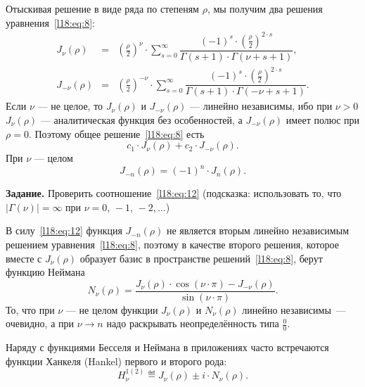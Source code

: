 Отыскивая решение в виде ряда по степеням $\rho$, мы получим два решения уравнения~\eqref{l18:eq:8}:
\begin{equation*}
	\begin{array}{rcl}  J_{\nu}(\rho)&=&\displaystyle\left(\frac{\rho}{2}\right)^{\nu}\cdot\sum\limits_{s=0}^{\infty}\dfrac{(-1)^s\cdot\left(\frac{\rho}{2}\right)^{2\cdot s}}{\Gamma(s+1)\cdot\Gamma(\nu+s+1)},\\[12pt]  J_{-\nu}(\rho)&=&\displaystyle\left(\frac{\rho}{2}\right)^{-\nu}\cdot\sum\limits_{s=0}^{\infty}\dfrac{(-1)^s\cdot\left(\frac{\rho}{2}\right)^{2\cdot s}}{\Gamma(s+1)\cdot\Gamma(-\nu+s+1)}.
	\end{array}
\end{equation*} 
Если $\nu$ --- не целое, то $J_{\nu}(\rho)$ и $J_{-\nu}(\rho)$ --- линейно независимы, ибо при $\nu>0$ $J_{\nu}(\rho)$ --- аналитическая функция без особенностей, а $J_{-\nu}(\rho)$ имеет полюс при $\rho=0$. Поэтому общее решение~\eqref{l18:eq:8} есть
\begin{equation*}
	 c_1\cdot J_{\nu}(\rho)+c_2\cdot J_{-\nu}(\rho).
\end{equation*} 
При $\nu$ --- целом 
\begin{equation}\label{l18:eq:12}
	 J_{-n}(\rho)=(-1)^{n}\cdot J_n(\rho).
\end{equation}

\noindent\textbf{Задание. }Проверить соотношение~\eqref{l18:eq:12} (подсказка: использовать то, что $|\Gamma(\nu)|=\infty$ при $\nu=0,\,-1,\,-2,\ldots$)
\vspace*{0.2cm}

\noindent В силу~\eqref{l18:eq:12} функция $J_{-n}(\rho)$ не является вторым линейно независимым решением уравнения~\eqref{l18:eq:8}, поэтому в качестве второго решения, которое вместе с $J_{\nu}(\rho)$ образует базис в пространстве решений~\eqref{l18:eq:8}, берут функцию Неймана
\begin{equation*}
	 N_{\nu}(\rho)=\dfrac{J_{\nu}(\rho)\cdot\cos\left(\nu\cdot\pi\right)-J_{-\nu}(\rho)}{\sin\left(\nu\cdot\pi\right)}.
\end{equation*}
То, что при $\nu$ --- не целом функции $J_{\nu}(\rho)$ и $N_{\nu}(\rho)$ линейно независимы~--- очевидно, а при $\nu\to n$ надо раскрывать неопределённость типа $\frac{0}{0}$.

Наряду с функциями Бесселя и Неймана в приложениях часто встречаются функции Ханкеля (Hankel) первого и второго рода:
\begin{equation*}
	 H_{\nu}^{1(2)}\eqdef J_{\nu}(\rho)\pm i\cdot N_{\nu}(\rho).
\end{equation*}

